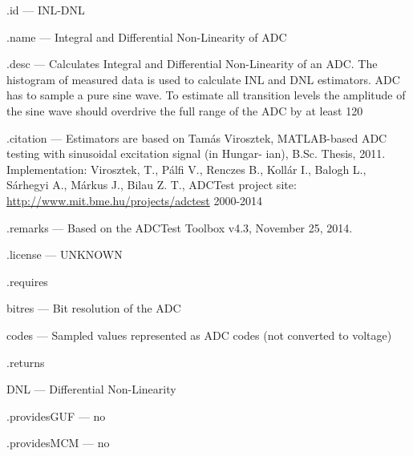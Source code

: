 \begin{tightdesc}
\item [\textsf{.id}] --- INL-DNL
\item [\textsf{.name}] --- Integral and Differential Non-Linearity of ADC
\item [\textsf{.desc}] --- Calculates Integral and Differential Non-Linearity of an ADC. The histogram of measured data is used to calculate INL and DNL estimators. ADC has to sample a pure sine wave. To estimate all transition levels the amplitude of the sine wave should overdrive the full range of the ADC by at least 120%
\item [\textsf{.citation}] --- Estimators are based on Tamás Virosztek, MATLAB-based ADC testing with sinusoidal excitation signal (in Hungar- ian), B.Sc. Thesis, 2011. Implementation: Virosztek, T., Pálfi V., Renczes B., Kollár I., Balogh L., Sárhegyi A., Márkus J., Bilau Z. T., ADCTest project site: \url{http://www.mit.bme.hu/projects/adctest} 2000-2014
\item [\textsf{.remarks}] --- Based on the ADCTest Toolbox v4.3, November 25, 2014.
\item [\textsf{.license}] --- UNKNOWN
\item [\textsf{.requires}] \rule{0em}{0em}
\begin{tightdesc}
\item [\textsf{bitres}] --- Bit resolution of the ADC
\item [\textsf{codes}] --- Sampled values represented as ADC codes (not converted to voltage)
\end{tightdesc}
\item [\textsf{.returns}] \rule{0em}{0em}
\begin{tightdesc}
\item [\textsf{DNL}] --- Differential Non-Linearity
\end{tightdesc}
\item [\textsf{.providesGUF}] --- no
\item [\textsf{.providesMCM}] ---  no
\end{tightdesc}
